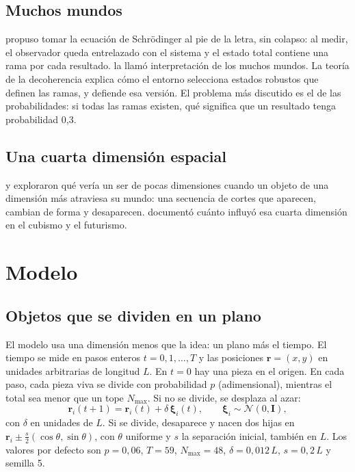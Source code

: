 \documentclass[11pt,a4paper]{article}
\begin{document}
\subsection{Muchos mundos}

\textcite{everett1957} propuso tomar la ecuación de Schrödinger al pie de la letra, sin colapso: al medir, el observador queda entrelazado con el sistema y el estado total contiene una rama por cada resultado. \textcite{dewitt1970} la llamó interpretación de los muchos mundos. La teoría de la decoherencia \parencite{zurek2003} explica cómo el entorno selecciona estados robustos que definen las ramas, y \textcite{wallace2012} defiende esa versión. El problema más discutido es el de las probabilidades: si todas las ramas existen, qué significa que un resultado tenga probabilidad 0,3.

\subsection{Una cuarta dimensión espacial}

\textcite{abbott1884} y \textcite{hinton1904} exploraron qué vería un ser de pocas dimensiones cuando un objeto de una dimensión más atraviesa su mundo: una secuencia de cortes que aparecen, cambian de forma y desaparecen. \textcite{henderson1983} documentó cuánto influyó esa cuarta dimensión en el cubismo y el futurismo.

\section{Modelo}\label{sec:modelo}

\subsection{Objetos que se dividen en un plano}

El modelo usa una dimensión menos que la idea: un plano más el tiempo. El tiempo se mide en pasos enteros $t = 0, 1, \dots, T$ y las posiciones $\mathbf r = (x, y)$ en unidades arbitrarias de longitud $L$. En $t = 0$ hay una pieza en el origen. En cada paso, cada pieza viva se divide con probabilidad $p$ (adimensional), mientras el total sea menor que un tope $N_{\max}$. Si no se divide, se desplaza al azar:
\begin{equation}\label{eq:paso}
\mathbf r_i(t+1) = \mathbf r_i(t) + \delta\,\boldsymbol\xi_i(t), \qquad \boldsymbol\xi_i \sim \mathcal N(0, \mathbf I),
\end{equation}
con $\delta$ en unidades de $L$. Si se divide, desaparece y nacen dos hijas en $\mathbf r_i \pm \tfrac{s}{2}(\cos\theta, \sin\theta)$, con $\theta$ uniforme y $s$ la separación inicial, también en $L$. Los valores por defecto son $p = 0{,}06$, $T = 59$, $N_{\max} = 48$, $\delta = 0{,}012\,L$, $s = 0{,}2\,L$ y semilla 5.
\end{document}
